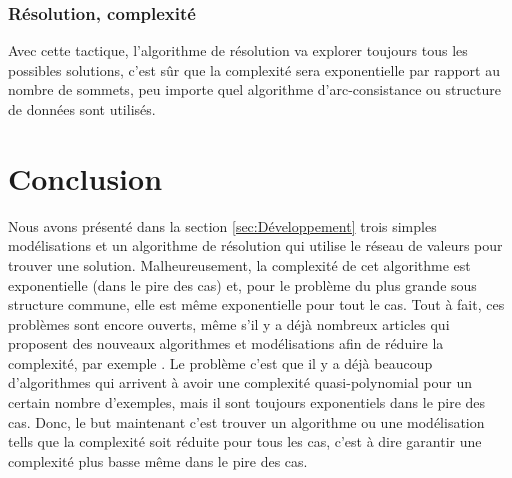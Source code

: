 \documentclass[french]{article}
\theoremstyle{definition}
\theoremstyle{remark}
\begin{document}
\subsubsection{Résolution, complexité}
Avec cette tactique, l'algorithme de résolution va explorer toujours tous les possibles solutions, c'est sûr que la complexité sera exponentielle par rapport au nombre de sommets, peu importe quel algorithme d'arc-consistance ou structure de données sont utilisés. 

\newpage
\section{Conclusion}
\label{sec:conc}
Nous avons présenté dans la section \ref{sec:Développement} trois simples modélisations et un algorithme de résolution qui utilise le réseau de valeurs pour trouver une solution. Malheureusement, la complexité de cet algorithme est exponentielle (dans le pire des cas) et, pour le problème du plus grande sous structure commune, elle est même exponentielle pour tout le cas. Tout à fait, ces problèmes sont encore ouverts, même s'il y a déjà nombreux articles qui proposent des nouveaux algorithmes et modélisations afin de réduire la complexité, par exemple \cite{SorlinS082010,SorlinS08, TakapouiB16}. Le problème c'est que il y a déjà beaucoup d'algorithmes qui arrivent à avoir une complexité quasi-polynomial pour un certain nombre d'exemples, mais il sont toujours exponentiels dans le pire des cas. Donc, le but maintenant c'est trouver un algorithme ou une modélisation tells que la complexité soit réduite pour tous les cas, c'est à dire garantir une complexité plus basse même dans le pire des cas.



\newpage


\end{document}

